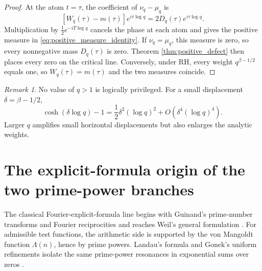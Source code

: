\documentclass[11pt]{amsart}
\numberwithin{equation}{section}
\theoremstyle{plain}
\theoremstyle{definition}
\theoremstyle{remark}
\newtheorem{remark}[theorem]{Remark}
\newcommand{\RH}{\mathrm{RH}}
\newcommand{\1}{\mathbf{1}}
\begin{document}
\begin{proof}
At the atom \(t=\tau\), the coefficient of \(\nu_q-\mu_q\) is
\begin{equation}
\left[W_q(\tau)-m(\tau)\right]e^{i\tau\log q}
=
2D_q(\tau)e^{i\tau\log q}.
\label{eq:atomic_difference_coefficient}
\end{equation}
Multiplication by \(\frac12e^{-iT\log q}\) cancels the phase at each
atom and gives the positive measure in
\eqref{eq:positive_measure_identity}.  If \(\nu_q=\mu_q\), this measure
is zero, so every nonnegative mass \(D_q(\tau)\) is zero.  Theorem
\ref{thm:positive_defect} then places every zero on the critical line.
Conversely, under \(\RH\), every weight \(q^{\beta-1/2}\) equals one, so
\(W_q(\tau)=m(\tau)\) and the two measures coincide.
\end{proof}

\begin{remark}
\label{rem:q_sensitivity}
No value of \(q>1\) is logically privileged.  For a small displacement
\(\delta=\beta-1/2\),
\begin{equation}
\cosh(\delta\log q)-1
=
\frac12\delta^2(\log q)^2
+
O\left(\delta^4(\log q)^4\right).
\label{eq:q_sensitivity}
\end{equation}
Larger \(q\) amplifies small horizontal displacements but also enlarges
the analytic weights.
\end{remark}

\section{The explicit-formula origin of the two prime-power branches}
\label{sec:explicit_formula_branches}

The classical Fourier-explicit-formula line begins with Guinand's prime-number transforms and Fourier reciprocities and reaches Weil's general formulation \cite{Guinand1947,Guinand1949,Guinand1948,Weil1952}.  For admissible test functions, the arithmetic side is supported by the von Mangoldt function \(\Lambda(n)\), hence by prime powers.
Landau's formula and Gonek's uniform refinements isolate the same
prime-power resonances in exponential sums over zeros
\cite{Gonek1985,FordZaharescu2005,FordSoundararajanZaharescu2009}.
\end{document}
